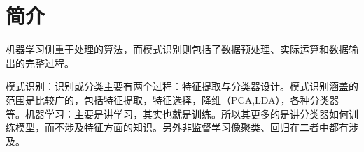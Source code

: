 
\section{简介}
机器学习侧重于处理的算法，而模式识别则包括了数据预处理、实际运算和数据输出的完整过程。

模式识别：识别或分类主要有两个过程：特征提取与分类器设计。模式识别涵盖的范围是比较广的，包括特征提取，特征选择，降维（PCA,LDA），各种分类器等。机器学习：主要是讲学习，其实也就是训练。所以其更多的是讲分类器如何训练模型，而不涉及特征方面的知识。另外非监督学习像聚类、回归在二者中都有涉及。